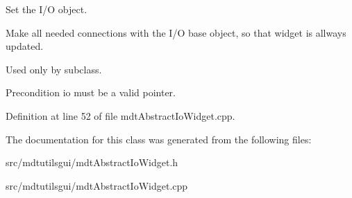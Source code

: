 Set the I/O object. 

Make all needed connections with the I/O base object, so that widget is allways updated.

Used only by subclass.

\begin{DoxyPrecond}{Precondition}
io must be a valid pointer. 
\end{DoxyPrecond}


Definition at line 52 of file mdtAbstractIoWidget.cpp.



The documentation for this class was generated from the following files:\begin{DoxyCompactItemize}
\item 
src/mdtutilsgui/mdtAbstractIoWidget.h\item 
src/mdtutilsgui/mdtAbstractIoWidget.cpp\end{DoxyCompactItemize}
